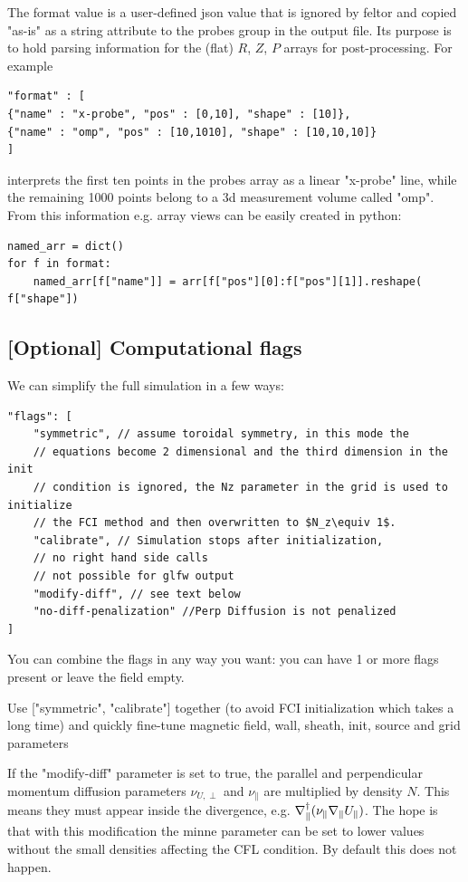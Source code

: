 The format value is a user-defined json value that is ignored by feltor and
copied "as-is" as a string attribute to the probes group in the output file.
Its purpose is to hold parsing information for the (flat) $R$, $Z$, $P$ arrays
for post-processing. For example
\begin{verbatim}
"format" : [
{"name" : "x-probe", "pos" : [0,10], "shape" : [10]},
{"name" : "omp", "pos" : [10,1010], "shape" : [10,10,10]}
]
\end{verbatim}
interprets the first ten points in the probes array as a linear "x-probe" line,
while the remaining 1000 points belong to a 3d measurement volume called "omp".
From this information e.g. array views can be easily created in python:
\begin{verbatim}
named_arr = dict()
for f in format:
    named_arr[f["name"]] = arr[f["pos"][0]:f["pos"][1]].reshape( f["shape"])
\end{verbatim}

\subsection{[Optional] Computational flags}
We can simplify the full simulation in a few ways:
\begin{verbatim}
"flags": [
    "symmetric", // assume toroidal symmetry, in this mode the
    // equations become 2 dimensional and the third dimension in the init
    // condition is ignored, the Nz parameter in the grid is used to initialize
    // the FCI method and then overwritten to $N_z\equiv 1$.
    "calibrate", // Simulation stops after initialization,
    // no right hand side calls
    // not possible for glfw output
    "modify-diff", // see text below
    "no-diff-penalization" //Perp Diffusion is not penalized
]
\end{verbatim}
You can combine the flags in any way you want: you can have 1 or more
flags present or leave the field empty.
\begin{tcolorbox}[title=Note]
    Use ["symmetric", "calibrate"] together (to avoid FCI initialization
    which takes a long time) and quickly fine-tune
    magnetic field, wall, sheath, init, source and grid parameters
\end{tcolorbox}
If the  "modify-diff" parameter is set to true, the parallel and perpendicular
momentum diffusion parameters $\nu_{U,\perp}$ and $\nu_\parallel$ are
multiplied by density $N$. This means they must appear inside the
divergence, e.g. $\nabla_\parallel^\dagger (\nu_{\parallel} \nabla_\parallel U_\parallel)$.
The hope is that with this modification the minne parameter can be set
to lower values without the small densities affecting the CFL condition.
By default this does not happen.

